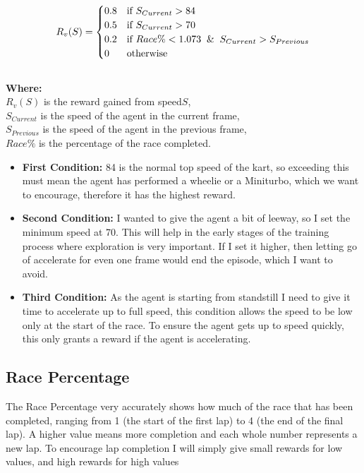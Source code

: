 \documentclass{article}
\begin{document}
\[
R_{v}(S) =
\begin{cases}
  0.8 & \text{if } S_{Current} > 84 \\
  0.5 & \text{if } S_{Current} > 70 \\
  0.2 & \text{if } Race\% < 1.073 \And S_{Current} > S_{Previous} \\
  0 & \text{otherwise }
\end{cases}
\]
\\
\textbf{Where:}\\ $R_{v}(S)$ is the reward gained from speed$S$,
\\$S_{Current}$ is the speed of the agent in the current frame,
\\$S_{Previous}$ is the speed of the agent in the previous frame,
\\$Race\%$ is the percentage of the race completed.
\\
\begin{itemize}
    \item \textbf{First Condition:}
    84 is the normal top speed of the kart, so exceeding this must mean the agent has performed a wheelie or a Miniturbo, which we want to encourage, therefore it has the highest reward.
    \item \textbf{Second Condition:}
    I wanted to give the agent a bit of leeway, so I set the minimum speed at 70. This will help in the early stages of the training process where exploration is very important. If I set it higher, then letting go of accelerate for even one frame would end the episode, which I want to avoid.
    \item \textbf{Third Condition:} As the agent is starting from standstill I need to give it time to accelerate up to full speed, this condition allows the speed to be low only at the start of the race. To ensure the agent gets up to speed quickly, this only grants a reward if the agent is accelerating.
\end{itemize}
 
\subsection{Race Percentage}
The Race Percentage very accurately shows how much of the race that has been completed, ranging from 1 (the start of the first lap) to 4 (the end of the final lap). A higher value means more completion and each whole number represents a new lap. To encourage lap completion I will simply give small rewards for low values, and high rewards for high values
\end{document}
